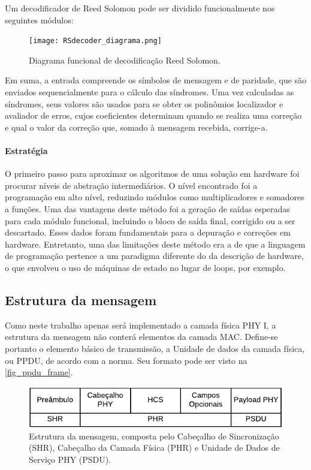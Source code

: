 	Um decodificador de Reed Solomon pode ser dividido funcionalmente nos seguintes módulos:

	\begin{figure}[!htb]
		\caption{\label{RSDecoder_diagrama_logico} Diagrama funcional de decodificação Reed Solomon.}
		\centering
		\texttt{[image: RSdecoder\_diagrama.png]}
	\end{figure}

	Em suma, a entrada compreende os símbolos de mensagem e de paridade, que são enviados sequencialmente para o cálculo das síndromes. Uma vez calculadas as síndromes, seus valores são usados para se obter os polinômios localizador e avaliador de erros, cujos coeficientes determinam quando se realiza uma correção e qual o valor da correção que, somado à mensagem recebida, corrige-a.

	\paragraph*{Estratégia}

	O primeiro passo para aproximar os algoritmos de uma solução em hardware foi procurar níveis de abstração intermediários. O nível encontrado foi a programação em alto nível, reduzindo módulos como multiplicadores e somadores a funções. Uma das vantagens deste método foi a geração de saídas esperadas para cada módulo funcional, incluindo o bloco de saída final, corrigido ou a ser descartado. Esses dados foram fundamentais para a depuração e correções em hardware. Entretanto, uma das limitações deste método era a de que a linguagem de programação pertence a um paradigma diferente do da descrição de hardware, o que envolveu o uso de máquinas de estado no lugar de loops, por exemplo.

	\subsection{Estrutura da mensagem}

	Como neste trabalho apenas será implementado a camada física PHY I, a estrutura da mensagem não conterá elementos da camada MAC. Define-se portanto o elemento básico de transmissão, a Unidade de dados da camada física, ou PPDU, de acordo com a norma. Seu formato pode ser visto na \autoref{fig_ppdu_frame}.

	\begin{figure}[h]
		\caption{\label{fig_ppdu_frame} Estrutura da mensagem, composta pelo Cabeçalho de Sincronização (SHR), Cabeçalho da Camada Física (PHR) e Unidade de Dados de Serviço PHY (PSDU).}
		\centering
		\includegraphics[width=0.5\textheight]{frame/PPDU.pdf}
	\end{figure}

